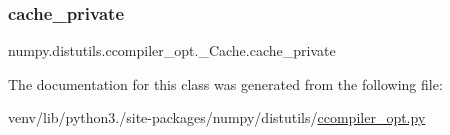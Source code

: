\subsubsection{\texorpdfstring{cache\+\_\+private}{cache\_private}}
{\footnotesize\ttfamily numpy.\+distutils.\+ccompiler\+\_\+opt.\+\_\+\+Cache.\+cache\+\_\+private}



The documentation for this class was generated from the following file\+:\begin{DoxyCompactItemize}
\item 
venv/lib/python3./site-\/packages/numpy/distutils/\hyperlink{ccompiler__opt_8py}{ccompiler\+\_\+opt.\+py}\end{DoxyCompactItemize}
